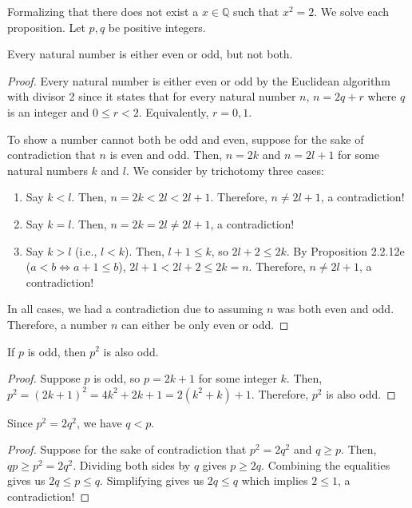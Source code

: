\begin{problem}{Formalizing that there does not exist a $x \in \mathbb{Q}$ such that $x^2 = 2.$}
    We solve each proposition. Let $p, q$ be positive integers.
\end{problem}
\begin{proposition}
    Every natural number is either even or odd, but not both.
\end{proposition}
\begin{proof}
    Every natural number is either even or odd by the Euclidean algorithm with divisor 2 since it states that for every natural number $n$, $n = 2q + r$ where $q$ is an integer and $0 \leq r < 2.$
    Equivalently, $r = 0, 1.$

    To show a number cannot both be odd and even, suppose for the sake of contradiction that $n$ is even and odd.
    Then, $n = 2k$ and $n = 2l + 1$ for some natural numbers $k$ and $l$.
    We consider by trichotomy three cases:
    \begin{enumerate}
        \item Say $k < l$.
        Then, $n = 2k < 2l < 2l + 1$. Therefore, $n \neq 2l + 1$, a contradiction!
        \item Say $k = l$. Then, $n = 2k = 2l \neq 2l + 1$, a contradiction!
        \item Say $k > l$ (i.e., $l < k$). Then, $l + 1 \leq k$, so $2l + 2 \leq 2k$.
        By Proposition 2.2.12e ($a < b \iff a + 1 \leq b$), $2l + 1 < 2l + 2 \leq 2k = n.$ Therefore, $n \neq 2l + 1$, a contradiction!
    \end{enumerate}
    In all cases, we had a contradiction due to assuming $n$ was both even and odd.
    Therefore, a number $n$ can either be only even or odd.
\end{proof}
\begin{proposition}
    If $p$ is odd, then $p^2$ is also odd.
\end{proposition}
\begin{proof}
    Suppose $p$ is odd, so $p = 2k + 1$ for some integer $k$. 
    Then, $p^2 = (2k + 1)^2 = 4k^2 + 2k + 1 = 2(k^2 + k) + 1.$
    Therefore, $p^2$ is also odd.
\end{proof}

\begin{proposition}
    Since $p^2 = 2q^2$, we have $q < p$.
\end{proposition}
\begin{proof}
    Suppose for the sake of contradiction that $p^2 = 2q^2$ and $q \geq p.$
    Then, $qp \geq p^2 = 2q^2$. Dividing both sides by $q$ gives $p \geq 2q.$ 
    Combining the equalities gives us $2q \leq p \leq q.$ 
    Simplifying gives us $2q \leq q$ which implies $2 \leq 1$, a contradiction!
\end{proof}

